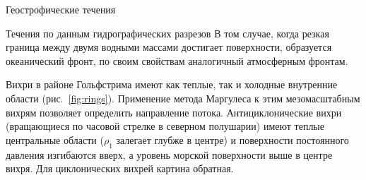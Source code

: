 \begin{chapter}{Геострофические течения}
\begin{section}{Течения по данным гидрографических разрезов}
В том случае, когда резкая граница между двумя водными массами
достигает поверхности, образуется океанический фронт, по своим
свойствам аналогичный атмосферным фронтам.
%

Вихри в районе Гольфстрима имеют как теплые, так и холодные внутренние
области (рис.~\ref{fig:rings}). Применение метода Маргулеса к этим 
мезомасштабным вихрям позволяет определить 
направление потока. Антициклонические вихри (вращающиеся по часовой стрелке 
в северном полушарии) имеют теплые центральные области ($\rho_1$ залегает 
глубже в центре) и поверхности постоянного давления изгибаются вверх, 
а уровень морской поверхности выше в центре вихря. Для циклонических вихрей 
картина обратная.
%


\end{section}
\end{chapter}
